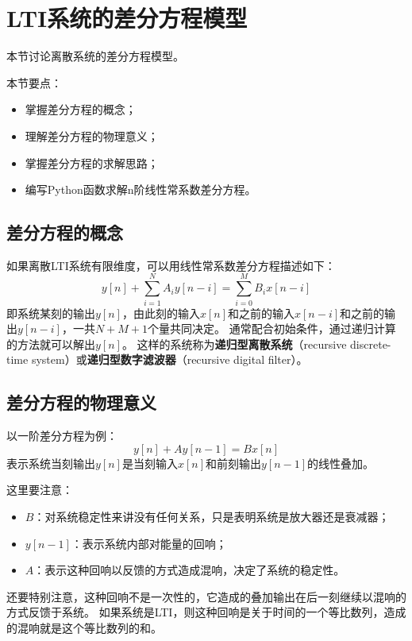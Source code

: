 \section{LTI系统的差分方程模型}

本节讨论离散系统的差分方程模型。

本节要点：
\begin{itemize}
    \item 掌握差分方程的概念；
    \item 理解差分方程的物理意义；
    \item 掌握差分方程的求解思路；
    \item 编写Python函数求解n阶线性常系数差分方程。
\end{itemize}

\subsection{差分方程的概念}

如果离散LTI系统有限维度，可以用线性常系数差分方程描述如下：
\[
y\left[ n \right] +\sum_{i=1}^N{A_iy\left[ n-i \right]}=\sum_{i=0}^M{B_ix\left[ n-i \right]}
\]
即系统某刻的输出$y\left[ n \right] $，由此刻的输入$x\left[ n \right] $和之前的输入$x\left[ n-i \right] $和之前的输出$y\left[ n-i \right] $，一共$N+M+1$个量共同决定。
通常配合初始条件，通过递归计算的方法就可以解出$y\left[ n \right] $。
这样的系统称为{\bf 递归型离散系统}（recursive discrete-time system）或{\bf 递归型数字滤波器}（recursive digital filter）。

\subsection{差分方程的物理意义}

以一阶差分方程为例：
\[
y\left[ n \right] +Ay\left[ n-1 \right] =Bx\left[ n \right]
\]
表示系统当刻输出$y\left[ n \right] $是当刻输入$x\left[ n \right] $和前刻输出$y\left[ n-1 \right] $的线性叠加。

这里要注意：
\begin{itemize}
    \item $B$：对系统稳定性来讲没有任何关系，只是表明系统是放大器还是衰减器；
    \item $y\left[ n-1 \right] $：表示系统内部对能量的回响；
    \item $A$：表示这种回响以反馈的方式造成混响，决定了系统的稳定性。
\end{itemize}
还要特别注意，这种回响不是一次性的，它造成的叠加输出在后一刻继续以混响的方式反馈于系统。
如果系统是LTI，则这种回响是关于时间的一个等比数列，造成的混响就是这个等比数列的和。

